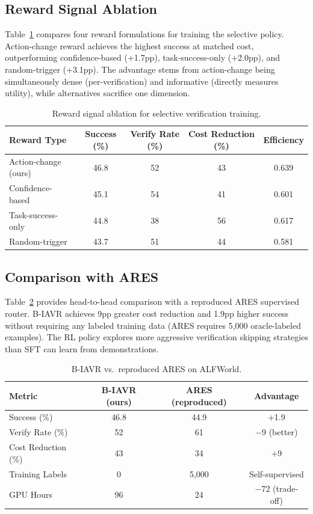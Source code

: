 \documentclass[11pt]{article}
\begin{document}
\subsection{Reward Signal Ablation}

Table~\ref{tab:reward_ablation} compares four reward formulations for training the selective policy. Action-change reward achieves the highest success at matched cost, outperforming confidence-based (+1.7pp), task-success-only (+2.0pp), and random-trigger (+3.1pp). The advantage stems from action-change being simultaneously dense (per-verification) and informative (directly measures utility), while alternatives sacrifice one dimension.

\begin{table}[h]
\centering
\caption{Reward signal ablation for selective verification training.}
\label{tab:reward_ablation}
\begin{tabular}{lcccc}
\toprule
Reward Type & Success (\%) & Verify Rate (\%) & Cost Reduction (\%) & Efficiency \\
\midrule
Action-change (ours) & 46.8 & 52 & 43 & 0.639 \\
Confidence-based & 45.1 & 54 & 41 & 0.601 \\
Task-success-only & 44.8 & 38 & 56 & 0.617 \\
Random-trigger & 43.7 & 51 & 44 & 0.581 \\
\bottomrule
\end{tabular}
\end{table}

\subsection{Comparison with ARES}

Table~\ref{tab:ares} provides head-to-head comparison with a reproduced ARES supervised router. B-IAVR achieves 9pp greater cost reduction and 1.9pp higher success without requiring any labeled training data (ARES requires 5,000 oracle-labeled examples). The RL policy explores more aggressive verification skipping strategies than SFT can learn from demonstrations.

\begin{table}[h]
\centering
\caption{B-IAVR vs.\ reproduced ARES on ALFWorld.}
\label{tab:ares}
\begin{tabular}{lccc}
\toprule
Metric & B-IAVR (ours) & ARES (reproduced) & Advantage \\
\midrule
Success (\%) & 46.8 & 44.9 & +1.9 \\
Verify Rate (\%) & 52 & 61 & $-$9 (better) \\
Cost Reduction (\%) & 43 & 34 & +9 \\
Training Labels & 0 & 5,000 & Self-supervised \\
GPU Hours & 96 & 24 & $-$72 (trade-off) \\
\bottomrule
\end{tabular}
\end{table}
\end{document}

